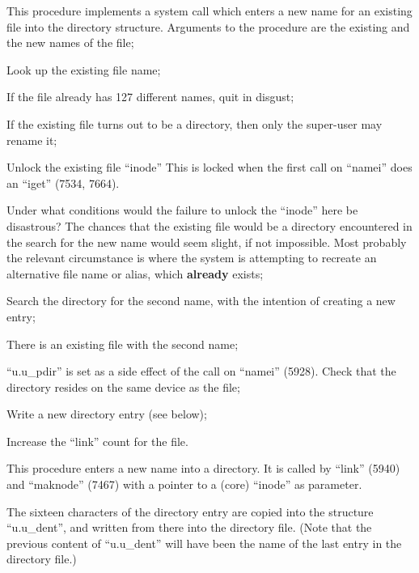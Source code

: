 
This procedure implements a system call
which enters a new name for an existing
file  into  the  directory   structure.
Arguments  to  the  procedure  are  the
existing and the new names of the file;

\bd
\item[5914:] Look up the existing file name;

\item[5917:] If the file already has 127  different names, quit in disgust;

\item[5921:] If the existing file turns out to
      be  a  directory,  then  only the
      super-user may rename it;

\item[5926:] Unlock the existing file  ``inode''
      This  is  locked  when  the first
      call on ``namei''  does  an  ``iget''
      (7534, 7664).

Under what conditions  would  the
failure  to  unlock  the  ``inode''
here be disastrous?  The  chances
that the existing file would be a
directory  encountered   in   the
search  for  the  new  name would
seem slight, if  not  impossible.
Most  probably  the relevant circumstance is where the system  is
attempting  to recreate an alternative file name or alias,  which
{\bf already} exists;

\item[5927:] Search  the  directory  for   the
      second  name,  with the intention
      of creating a new entry;

\item[5930:] There is an  existing  file  with
      the second name;

\item[5935:] ``u.u\_pdir'' is set as a side effect
of  the  call  on ``namei'' (5928).
Check that the directory  resides
on the same device as the file;

\item[5940:] Write a new directory entry  (see
      below);

\item[5941:] Increase the ``link'' count for the
      file.
\ed



This procedure enters a new name into a
directory.   It  is  called  by  ``link''
(5940)  and  ``maknode''  (7467)  with  a
pointer  to a (core) ``inode'' as parameter.


The sixteen characters of the directory
entry  are  copied  into  the structure
``u.u\_dent'', and written from there into
the directory file. (Note that the previous content of ``u.u\_dent''  will  have
been  the name of the last entry in the
directory file.)


